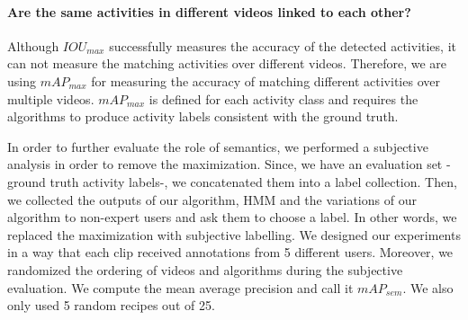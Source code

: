 \paragraph{Are the same activities in different videos linked to each other?}
Although $IOU_{max}$ successfully measures the accuracy of the detected activities, it can not measure the matching activities over different videos. Therefore, we are using $mAP_{max}$ for measuring the accuracy of matching different activities over multiple videos. $mAP_{max}$ is defined for each activity class and requires the algorithms to produce activity labels consistent with the ground truth.

In order to further evaluate the role of semantics, we performed a subjective analysis in order to remove the maximization. Since, we have an evaluation set -ground truth activity labels-, we concatenated them into a label collection. Then, we collected the outputs of our algorithm, HMM and the variations of our algorithm to non-expert users and ask them to choose a label. In other words, we replaced the maximization with subjective labelling. We designed our experiments in a way that each clip received annotations from 5 different users. Moreover, we randomized the ordering of videos and algorithms during the subjective evaluation. We compute the mean average precision and call it $mAP_{sem}$. We also only used 5 random recipes out of 25.

\begin{table}
\caption{Semantic mean-average-precision $mAP_{sem}$ computed based on subjective evaluation.}
{\small
{}}
\normalsize
\end{table}


